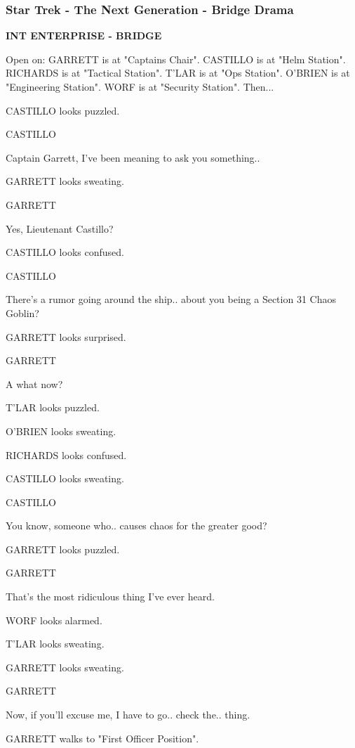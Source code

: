 \documentclass[11pt,letterpaper,oldstylefigures]{memoir}
\newcommand{\slugline}[1]{\nobreak\textbf{\MakeUppercase{#1}}\par\nobreak\vspace{1\baselineskip}}
\newcommand{\speaker}[1]{\nobreak\hspace*{0.333\textwidth}\MakeUppercase{#1}\par\nobreak\vspace{0.5\baselineskip}}
\newcommand{\dialogue}[1]{\nobreak\hspace*{0.25\textwidth}\begin{minipage}{0.5\textwidth}#1\end{minipage}\par\vspace{1\baselineskip}}
\newcommand{\stagedir}[1]{#1\par\vspace{1\baselineskip}}
\newenvironment{FountainExample}
  {\begingroup
  \ttfamily\small
   \setlength{\parindent}{0pt}
  \setlength{\parskip}{0.5em}
  \allowdisplaybreaks
  \setlength{\displaywidowpenalty}{0}
  \setlength{\widowpenalty}{0}
  \setlength{\clubpenalty}{0}
  \setlength{\interlinepenalty}{0}
}
  {\endgroup}
\begin{document}
\subsubsection*{Star Trek - The Next Generation - Bridge Drama}
\label{ex:star-trek-the-next-generation-bridge-drama}

\begin{FountainExample}
\slugline{INT ENTERPRISE - BRIDGE}

\stagedir{Open on: GARRETT is at "Captains Chair". CASTILLO is at "Helm Station". RICHARDS is at "Tactical Station". T'LAR is at "Ops Station". O'BRIEN is at "Engineering Station". WORF is at "Security Station". Then...}

\stagedir{CASTILLO looks puzzled.}

\speaker{CASTILLO}
\dialogue{Captain Garrett, I've been meaning to ask you something..}

\stagedir{GARRETT looks sweating.}

\speaker{GARRETT}
\dialogue{Yes, Lieutenant Castillo?}

\stagedir{CASTILLO looks confused.}

\speaker{CASTILLO}
\dialogue{There's a rumor going around the ship.. about you being a Section 31 Chaos Goblin?}

\stagedir{GARRETT looks surprised.}

\speaker{GARRETT}
\dialogue{A what now?}

\stagedir{T'LAR looks puzzled.}

\stagedir{O'BRIEN looks sweating.}

\stagedir{RICHARDS looks confused.}

\stagedir{CASTILLO looks sweating.}

\speaker{CASTILLO}
\dialogue{You know, someone who.. causes chaos for the greater good?}

\stagedir{GARRETT looks puzzled.}

\speaker{GARRETT}
\dialogue{That's the most ridiculous thing I've ever heard.}

\stagedir{WORF looks alarmed.}

\stagedir{T'LAR looks sweating.}

\stagedir{GARRETT looks sweating.}

\speaker{GARRETT}
\dialogue{Now, if you'll excuse me, I have to go.. check the.. thing.}

\stagedir{GARRETT walks to "First Officer Position".}


\end{FountainExample}
\end{document}
